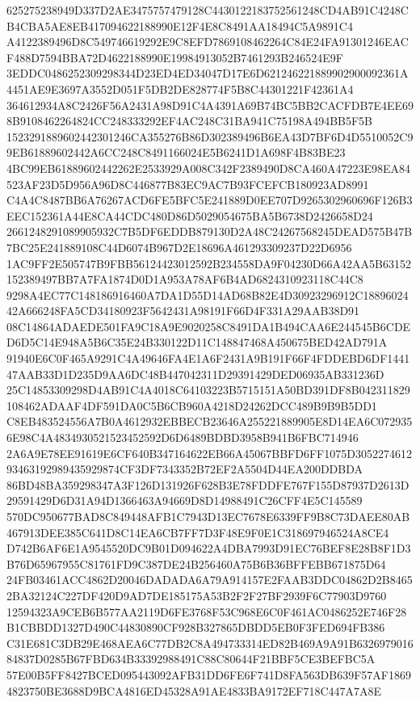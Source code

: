 \documentclass[UTF8,fontset=fandol,zihao=-4,a4paper]{ctexart}
\begin{document}
{{625275238949D337D2AE3475757479128C4430122183752561248CD4AB91C4248CB4CBA5AE8EB417094622188990E12F4E8C8491AA18494C5A9891C4
A4122389496D8C549746619292E9C8EFD7869108462264C84E24FA91301246EACF488D7594BBA72D4622188990E19984913052B7461293B246524E9F
3EDDC0486252309298344D23ED4ED34047D17E6D621246221889902900092361A4451AE9E3697A3552D051F5DB2DE828774F5B8C44301221F42361A4
364612934A8C2426F56A2431A98D91C4A4391A69B74BC5BB2CACFDB7E4EE698B9108462264824CC248333292EF4AC248C31BA941C75198A494BB5F5B
1523291889602442301246CA355276B86D302389496B6EA43D7BF6D4D5510052C99EB61889602442A6CC248C8491166024E5B6241D1A698F4B83BE23
4BC99EB61889602442262E2533929A008C342F2389490D8CA460A47223E98EA84523AF23D5D956A96D8C446877B83EC9AC7B93FCEFCB180923AD8991
C4A4C8487BB6A76267ACD6FE5BFC5E241889D0EE707D9265302960696F126B3EEC152361A44E8CA44CDC480D86D5029054675BA5B6738D2426658D24
2661248291089905932C7B5DF6EDDB879130D2A48C24267568245DEAD575B47B7BC25E241889108C44D6074B967D2E18696A461293309237D22D6956
1AC9FF2E505747B9FBB56124423012592B234558DA9F04230D66A42AA5B63152152389497BB7A7FA1874D0D1A953A78AF6B4AD6824310923118C44C8
9298A4EC77C148186916460A7DA1D55D14AD68B82E4D30923296912C1889602442A666248FA5CD34180923F5642431A98191F66D4F331A29AAB38D91
08C14864ADAEDE501FA9C18A9E9020258C8491DA1B494CAA6E244545B6CDED6D5C14E948A5B6C35E24B330122D11C148847468A450675BED42AD791A
91940E6C0F465A9291C4A49646FA4E1A6F2431A9B191F66F4FDDEBD6DF144147AAB33D1D235D9AA6DC48B447042311D29391429DED06935AB331236D
25C14853309298D4AB91C4A4018C64103223B5715151A50BD391DF8B042311829108462ADAAF4DF591DA0C5B6CB960A4218D24262DCC489B9B9B5DD1
C8EB483524556A7B0A4612932EBBECB23646A255221889905E8D14EA6C0729356E98C4A4834930521523452592D6D6489BDBD3958B941B6FBC714946
2A6A9E78EE91619E6CF640B347164622EB66A45067BBFD6FF1075D305227461293463192989435929874CF3DF7343352B72EF2A5504D44EA200DDBDA
86BD48BA359298347A3F126D131926F628B3E78FDDFE767F155D87937D2613D29591429D6D31A94D1366463A94669D8D14988491C26CFF4E5C145589
570DC950677BAD8C849448AFB1C7943D13EC7678E6339FF9B8C73DAEE80AB467913DEE385C641D8C14EA6CB7FF7D3F48E9F0E1C318697946524A8CE4
D742B6AF6E1A9545520DC9B01D094622A4DBA7993D91EC76BEF8E28B8F1D3B76D65967955C81761FD9C387DE24B256460A75B6B36BFFEBB671875D64
24FB03461ACC4862D20046DADADA6A79A914157E2FAAB3DDC04862D2B84652BA32124C227DF420D9AD7DE185175A53B2F2F27BF2939F6C77903D9760
12594323A9CEB6B577AA2119D6FE3768F53C968E6C0F461AC0486252E746F28B1CBBDD1327D490C44830890CF928B327865DBDD5EB0F3FED694FB386
C31E681C3DB29E468AEA6C77DB2C8A494733314ED82B469A9A91B632697901684837D0285B67FBD634B33392988491C88C80644F21BBF5CE3BEFBC5A
57E00B5FF8427BCED095443092AFB31DD6FE6F741D8FA563DB639F57AF18694823750BE3688D9BCA4816ED45328A91AE4833BA9172EF718C447A7A8E
}}
\end{document}
